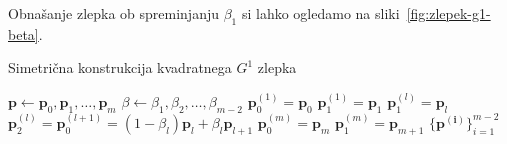 \documentclass[isrm2, tisk]{fmfdelo}
\newcommand{\p}{\mathbf{p}}
\begin{document}
    Obnašanje zlepka ob spreminjanju $\beta_1$ si lahko ogledamo na sliki~\ref{fig:zlepek-g1-beta}.
    \begin{algorithm}[H]
        \caption{Simetrična konstrukcija kvadratnega $G^1$ zlepka}
        \label{alg:G-1}
        \begin{algorithmic}
            \State $\p \gets \p_0,\p_1,\dots,\p_{m}$
            \State $\beta \gets \beta_1,\beta_2,\dots,\beta_{m-2}$
            \State $\p_0^{(1)} = \p_0$
            \State $\p_1^{(1)} = \p_1$
                \State $\p_1^{(l)}=\p_{l}$
                \State $\p_2^{(l)} = \p_0^{(l+1)} = (1-\beta_l)\p_l+\beta_l\p_{l+1}$
            \EndFor
            \State $\p_0^{(m)} = \p_m$
            \State $\p_1^{(m)} = \p_{m+1}$
            \State \Return $\{\mathbf{p^{(i)}}\}^{m-2}_{i=1}$
        \end{algorithmic}
    \end{algorithm}
\end{document}
